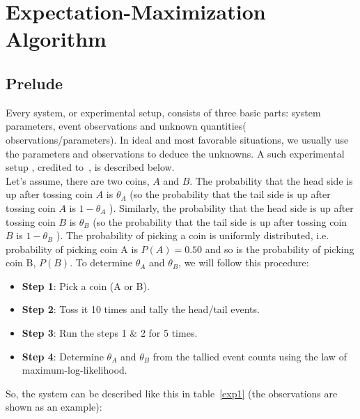 \section{Expectation-Maximization Algorithm}

\subsection{Prelude}
Every system, or experimental setup, consists of three basic parts: system parameters, event observations and unknown quantities( observations/parameters). In ideal and most favorable situations, we usually use the parameters and observations to deduce the unknowns. A such experimental setup , credited to~\cite{do2008expectation}, is described below.\\

Let's assume, there are two coins, $A$ and $B$. The probability that the head side is up after tossing coin $A$ is $\theta_{A}$ (so the probability that the tail side is up after tossing coin $A$ is $1-\theta_{A}$  ). Similarly, the probability that the head side is up after tossing coin $B$ is $\theta_{B}$ (so the probability that the tail side is up after tossing coin $B$ is $1-\theta_{B}$  ). The probability of picking a coin is uniformly distributed, i.e. probability of picking coin A is $P(A)=0.50$ and so is the probability of picking coin B, $P(B)$. To determine $\theta_A$ and $\theta_B$, we will follow this procedure:\\
\begin{itemize}
\item \textbf{Step 1}: Pick a coin (A or B).
\item \textbf{Step 2}: Toss it 10 times and tally the head/tail events.
\item \textbf{Step 3}: Run the steps 1 \& 2 for 5 times.
\item \textbf{Step 4}: Determine $\theta_A$ and $\theta_B$ from the tallied event counts using the law of maximum-log-likelihood.
\end{itemize} 

So, the system can be described like this in table~\ref{exp1} (the observations are shown as an example):\\

